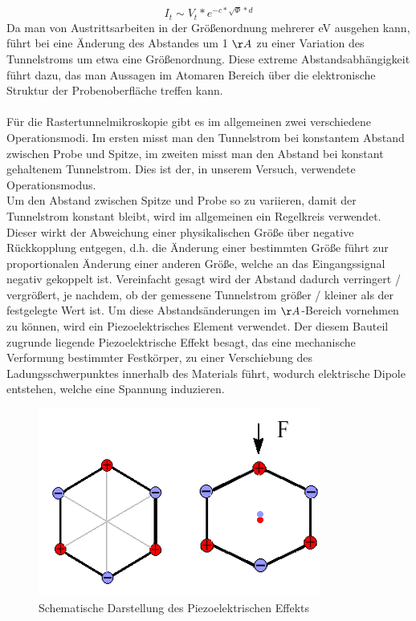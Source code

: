 \documentclass[10pt,a4paper]{article}
\begin{document}
\begin{equation}
I_{t} \sim V_{t} * e^{-c*\sqrt{\Phi }*d}
\end{equation}
Da man von Austrittsarbeiten in der Größenordnung mehrerer eV ausgehen kann, führt bei eine Änderung des Abstandes um 1 $\AA$ zu einer Variation des Tunnelstroms um etwa eine Größenordnung. Diese extreme Abstandsabhängigkeit führt dazu, das man Aussagen im Atomaren Bereich über die elektronische Struktur der Probenoberfläche treffen kann. \\ \\Für die Rastertunnelmikroskopie gibt es im allgemeinen zwei verschiedene Operationsmodi. Im ersten misst man den Tunnelstrom bei konstantem Abstand zwischen Probe und Spitze, im zweiten misst man den Abstand bei konstant gehaltenem Tunnelstrom. Dies ist der, in unserem Versuch, verwendete Operationsmodus. \\Um den Abstand zwischen Spitze und Probe so zu variieren, damit der Tunnelstrom konstant bleibt, wird im allgemeinen ein Regelkreis verwendet. Dieser wirkt der Abweichung einer physikalischen Größe über negative Rückkopplung entgegen, d.h. die Änderung einer bestimmten Größe führt zur proportionalen Änderung einer anderen Größe, welche an das Eingangssignal negativ gekoppelt ist. Vereinfacht gesagt wird der Abstand dadurch verringert / vergrößert, je nachdem, ob der gemessene Tunnelstrom größer / kleiner als der festgelegte Wert ist. Um diese Abstandsänderungen im $\AA$-Bereich vornehmen zu können, wird ein Piezoelektrisches Element verwendet. Der diesem Bauteil zugrunde liegende Piezoelektrische Effekt besagt, das eine mechanische Verformung bestimmter Festkörper, zu einer Verschiebung des Ladungsschwerpunktes innerhalb des Materials führt, wodurch elektrische Dipole entstehen, welche eine Spannung induzieren.
\begin{figure}[h]
	\includegraphics[scale = 1]{1piezo.png}
	\centering
	\caption{Schematische Darstellung des Piezoelektrischen Effekts}
	\label{diagramm_aufspaltung}
\end{figure}
\end{document}
